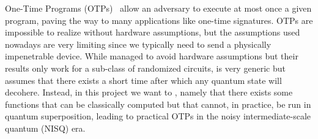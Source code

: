 One-Time Programs (OTPs)~\cite{BGS13_QuantumOneTimePrograms} allow an adversary to execute at most once a given program, paving the way to many applications like one-time signatures. OTPs are impossible to realize without hardware assumptions, but the assumptions used nowadays are very limiting since we typically need to send a physically impenetrable device. While \cite{gupte_quantum_2025} managed to avoid hardware assumptions but their results only work for a sub-class of randomized circuits, \cite{Liu23_DepthBoundedQuantumCryptography} is very generic but assumes that there exists a short time after which any quantum state will decohere. Instead, in this project we want to , namely that there exists some functions that can be classically computed but that cannot, in practice, be run in quantum superposition, leading to practical OTPs in the noisy intermediate-scale quantum (NISQ) era.




